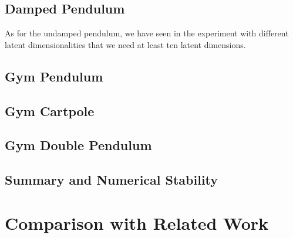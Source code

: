 	\subsection{Damped Pendulum}
		As for the undamped pendulum, we have seen in the experiment with different latent dimensionalities that we need at least ten latent dimensions.

	\subsection{Gym Pendulum}

	\subsection{Gym Cartpole}

	\subsection{Gym Double Pendulum}

	\subsection{Summary and Numerical Stability}
		\label{subsec:discussPerformanceNumerics}


\section{Comparison with Related Work}

